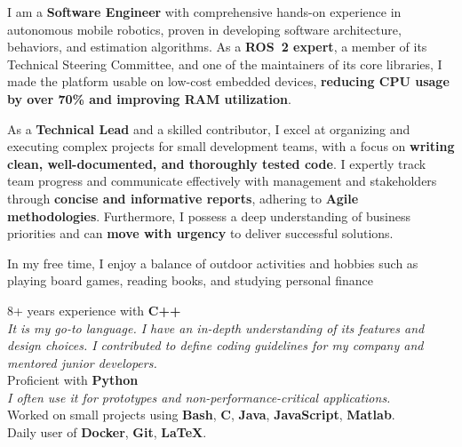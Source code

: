 \documentclass[letterpaper]{soragna-onepage-twocols} %
\begin{document}
\begin{minipage}[t]{0.3\textwidth} %



I am a \textbf{Software Engineer} with comprehensive hands-on experience in autonomous mobile robotics, proven in developing software architecture, behaviors, and estimation algorithms.
As a \textbf{ROS~2 expert}, a member of its Technical Steering Committee, and one of the maintainers of its core libraries, I made the platform usable on low-cost embedded devices, \textbf{reducing CPU usage by over 70\% and improving RAM utilization}.

As a \textbf{Technical Lead} and a skilled contributor, I excel at organizing and executing complex projects for small development teams, with a focus on \textbf{writing clean, well-documented, and thoroughly tested code}.
I expertly track team progress and communicate effectively with management and stakeholders through \textbf{concise and informative reports}, adhering to \textbf{Agile methodologies}.
Furthermore, I possess a deep understanding of business priorities and can \textbf{move with urgency} to deliver successful solutions.

In my free time, I enjoy a balance of outdoor activities and hobbies such as playing board games, reading books, and studying personal finance

\sectionspace %



8+ years experience with \textbf{C++}\\
{\emph{It is my go-to language.
I have an in-depth understanding of its features and design choices.
I contributed to define coding guidelines for my company and mentored junior developers.}}\\
Proficient with \textbf{Python}\\
{\emph{I often use it for prototypes and non-performance-critical applications.}}\\
Worked on small projects using \textbf{Bash}, \textbf{C}, \textbf{Java}, \textbf{JavaScript},  \textbf{Matlab}.\\
Daily user of \textbf{Docker}, \textbf{Git}, \textbf{LaTeX}.\\


\end{minipage}
\end{document}
